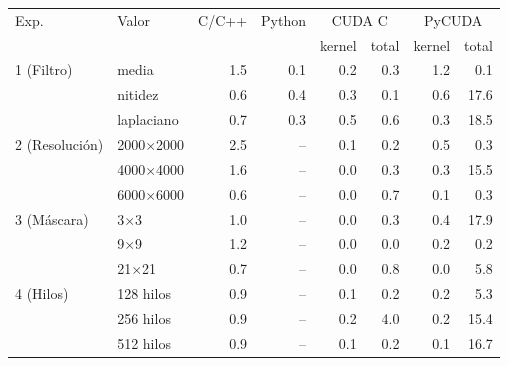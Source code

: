 \begin{tabular}{llrrrrrr}
\toprule
Exp. & Valor & C/C++ & Python & \multicolumn{2}{c}{CUDA C} & \multicolumn{2}{c}{PyCUDA} \\
 & & & & kernel & total & kernel & total \\
\midrule
1 (Filtro) & media & 1.5 & 0.1 & 0.2 & 0.3 & 1.2 & 0.1 \\
 & nitidez & 0.6 & 0.4 & 0.3 & 0.1 & 0.6 & 17.6 \\
 & laplaciano & 0.7 & 0.3 & 0.5 & 0.6 & 0.3 & 18.5 \\
\midrule
2 (Resolución) & 2000$\times$2000 & 2.5 & -- & 0.1 & 0.2 & 0.5 & 0.3 \\
 & 4000$\times$4000 & 1.6 & -- & 0.0 & 0.3 & 0.3 & 15.5 \\
 & 6000$\times$6000 & 0.6 & -- & 0.0 & 0.7 & 0.1 & 0.3 \\
\midrule
3 (Máscara) & 3$\times$3 & 1.0 & -- & 0.0 & 0.3 & 0.4 & 17.9 \\
 & 9$\times$9 & 1.2 & -- & 0.0 & 0.0 & 0.2 & 0.2 \\
 & 21$\times$21 & 0.7 & -- & 0.0 & 0.8 & 0.0 & 5.8 \\
\midrule
4 (Hilos) & 128 hilos & 0.9 & -- & 0.1 & 0.2 & 0.2 & 5.3 \\
 & 256 hilos & 0.9 & -- & 0.2 & 4.0 & 0.2 & 15.4 \\
 & 512 hilos & 0.9 & -- & 0.1 & 0.2 & 0.1 & 16.7 \\
\bottomrule
\end{tabular}
